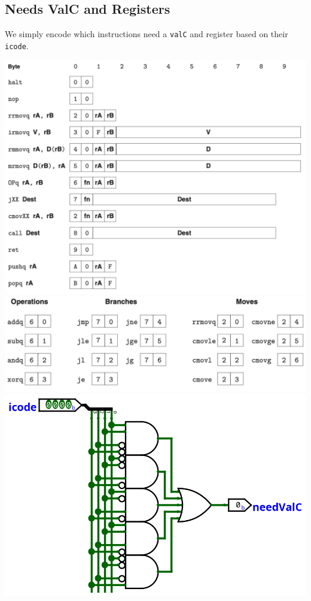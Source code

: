\documentclass{article}
\begin{document}
\subsection{Needs ValC and Registers}
We simply encode which instructions need a \verb+valC+ and register based on their \verb+icode+. 
\begin{center}
    \includegraphics[scale=.6]{icode.png} \\
    \includegraphics[scale=.8]{ops.png} 
    \\
    \includegraphics[scale=.7]{needsValC.png}

\end{center}
\end{document}
